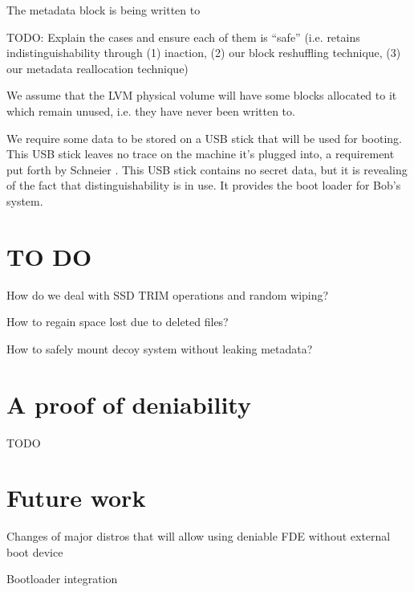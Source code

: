 \documentclass{acm_proc_article-sp}
\begin{document}
The metadata block is being written to

TODO: Explain the cases and ensure each of them is “safe” (i.e. retains
indistinguishability through (1) inaction, (2) our block reshuffling technique,
(3) our metadata reallocation technique)

We assume that the LVM physical volume will have some blocks allocated to it
which remain unused, i.e. they have never been written to.

We require some data to be stored on a USB stick that will be used for booting.
This USB stick leaves no trace on the machine it's plugged into, a requirement
put forth by Schneier \cite{c7}. This USB stick contains no secret data, but it
is revealing of the fact that distinguishability is in use. It provides the
boot loader for Bob’s system.

\section{TO DO}
How do we deal with SSD TRIM operations and random wiping?

How to regain space lost due to deleted files?

How to safely mount decoy system without leaking metadata?

\section{A proof of deniability}

TODO

\section{Future work}

Changes of major distros that will allow using deniable FDE without external
boot device

Bootloader integration
\end{document}

